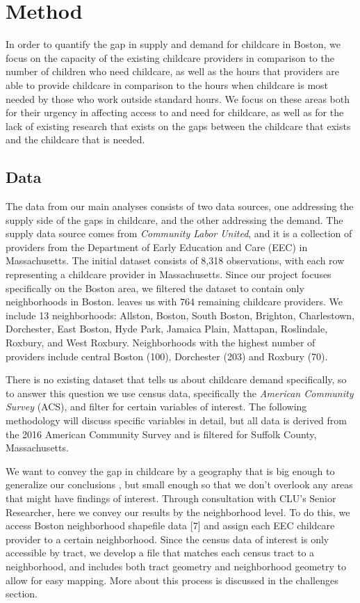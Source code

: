 \documentclass[10pt,letterpaper]{article}
\begin{document}
\section{Method}\label{method}

In order to quantify the gap in supply and demand for childcare in
Boston, we focus on the capacity of the existing childcare providers in
comparison to the number of children who need childcare, as well as the
hours that providers are able to provide childcare in comparison to the
hours when childcare is most needed by those who work outside standard
hours. We focus on these areas both for their urgency in affecting
access to and need for childcare, as well as for the lack of existing
research that exists on the gaps between the childcare that exists and
the childcare that is needed.

\subsection{Data}\label{data}

The data from our main analyses consists of two data sources, one
addressing the supply side of the gaps in childcare, and the other
addressing the demand. The supply data source comes from \emph{Community
Labor United}, and it is a collection of providers from the Department
of Early Education and Care (EEC) in Massachusetts. The initial dataset
consists of 8,318 observations, with each row representing a childcare
provider in Massachusetts. Since our project focuses specifically on the
Boston area, we filtered the dataset to contain only neighborhoods in
Boston. leaves us with 764 remaining childcare providers. We include 13
neighborhoods: Allston, Boston, South Boston, Brighton, Charlestown,
Dorchester, East Boston, Hyde Park, Jamaica Plain, Mattapan, Roslindale,
Roxbury, and West Roxbury. Neighborhoods with the highest number of
providers include central Boston (100), Dorchester (203) and Roxbury
(70).

There is no existing dataset that tells us about childcare demand
specifically, so to answer this question we use census data,
specifically the \emph{American Community Survey} (ACS), and filter for
certain variables of interest. The following methodology will discuss
specific variables in detail, but all data is derived from the 2016
American Community Survey and is filtered for Suffolk County,
Massachusetts.

We want to convey the gap in childcare by a geography that is big enough
to generalize our conclusions , but small enough so that we don't
overlook any areas that might have findings of interest. Through
consultation with CLU's Senior Researcher, here we convey our results by
the neighborhood level. To do this, we access Boston neighborhood
shapefile data {[}7{]} and assign each EEC childcare provider to a
certain neighborhood. Since the census data of interest is only
accessible by tract, we develop a file that matches each census tract to
a neighborhood, and includes both tract geometry and neighborhood
geometry to allow for easy mapping. More about this process is discussed
in the challenges section.
\end{document}
